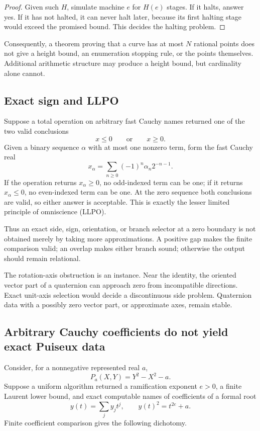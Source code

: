 \begin{proof}
Given such \(H\), simulate machine \(e\) for \(H(e)\) stages.  If it halts,
answer yes.  If it has not halted, it can never halt later, because its first
halting stage would exceed the promised bound.  This decides the halting
problem.
\end{proof}

Consequently, a theorem proving that a curve has at most \(N\) rational points
does not give a height bound, an enumeration stopping rule, or the points
themselves.  Additional arithmetic structure may produce a height bound, but
cardinality alone cannot.

\subsection{Exact sign and LLPO}

Suppose a total operation on arbitrary fast Cauchy names returned one of the
two valid conclusions
\[
 x\le0\qquad\text{or}\qquad x\ge0.
\]
Given a binary sequence \(\alpha\) with at most one nonzero term, form the fast
Cauchy real
\[
 x_\alpha=\sum_{n\ge0}(-1)^n\alpha_n2^{-n-1}.
\]
If the operation returns \(x_\alpha\ge0\), no odd-indexed term can be one; if
it returns \(x_\alpha\le0\), no even-indexed term can be one.  At the zero
sequence both conclusions are valid, so either answer is acceptable.  This is
exactly the lesser limited principle of omniscience (LLPO).

Thus an exact side, sign, orientation, or branch selector at a zero boundary
is not obtained merely by taking more approximations.  A positive gap makes
the finite comparison valid; an overlap makes either branch sound; otherwise
the output should remain relational.

The rotation-axis obstruction is an instance.  Near the identity, the
oriented vector part of a quaternion can approach zero from incompatible
directions.  Exact unit-axis selection would decide a discontinuous side
problem.  Quaternion data with a possibly zero vector part, or approximate
axes, remain stable.

\subsection{Arbitrary Cauchy coefficients do not yield exact Puiseux data}

Consider, for a nonnegative represented real \(a\),
\[
 P_a(X,Y)=Y^2-X^2-a.
\]
Suppose a uniform algorithm returned a ramification exponent \(e>0\), a
finite Laurent lower bound, and exact computable names of coefficients of a
formal root
\[
 y(t)=\sum_j y_jt^j,
 \qquad y(t)^2=t^{2e}+a.
\]
Finite coefficient comparison gives the following dichotomy.

